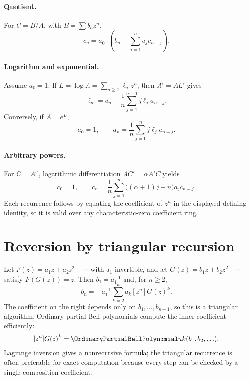 \documentclass[11pt,a4paper,oneside,openany]{book}
\theoremstyle{definition}
\theoremstyle{remark}
\begin{document}
\paragraph{Quotient.}
For $C=B/A$, with $B=\sum b_nz^n$,
\begin{equation}
 c_n=a_0^{-1}\left(b_n-\sum_{j=1}^na_jc_{n-j}\right).
 \label{new:eq:series-quotient-algorithm}
\end{equation}

\paragraph{Logarithm and exponential.}
Assume $a_0=1$.  If $L=\log A=\sum_{n\ge1}\ell_nz^n$, then $A'=AL'$ gives
\begin{equation}
 \ell_n=a_n-\frac1n\sum_{j=1}^{n-1}j\ell_j a_{n-j}.
 \label{new:eq:series-log-algorithm}
\end{equation}
Conversely, if $A=e^L$,
\begin{equation}
 a_0=1,\qquad
 a_n=\frac1n\sum_{j=1}^n j\ell_j a_{n-j}.
 \label{new:eq:series-exp-algorithm}
\end{equation}

\paragraph{Arbitrary powers.}
For $C=A^\alpha$, logarithmic differentiation $AC'=\alpha A'C$ yields
\begin{equation}
 c_0=1,\qquad
 c_n=\frac1n\sum_{j=1}^n\bigl((\alpha+1)j-n\bigr)a_jc_{n-j}.
 \label{new:eq:series-power-algorithm}
\end{equation}
Each recurrence follows by equating the coefficient of $z^n$ in the displayed
defining identity, so it is valid over any characteristic-zero coefficient
ring.

\section{Reversion by triangular recursion}

Let $F(z)=a_1z+a_2z^2+\cdots$ with $a_1$ invertible, and let
$G(z)=b_1z+b_2z^2+\cdots$ satisfy $F(G(z))=z$.  Then $b_1=a_1^{-1}$ and, for
$n\ge2$,
\begin{equation}
 b_n=-a_1^{-1}\sum_{k=2}^n a_k[z^n]G(z)^k.
 \label{new:eq:reversion-triangular}
\end{equation}
The coefficient on the right depends only on $b_1,\ldots,b_{n-1}$, so this is a
triangular algorithm.  Ordinary partial Bell polynomials compute the inner
coefficient efficiently:
\[
 [z^n]G(z)^k=\OrdinaryPartialBellPolynomial nk(b_1,b_2,\ldots).
\]
Lagrange inversion gives a nonrecursive formula; the triangular recurrence is
often preferable for exact computation because every step can be checked by a
single composition coefficient.
\end{document}
